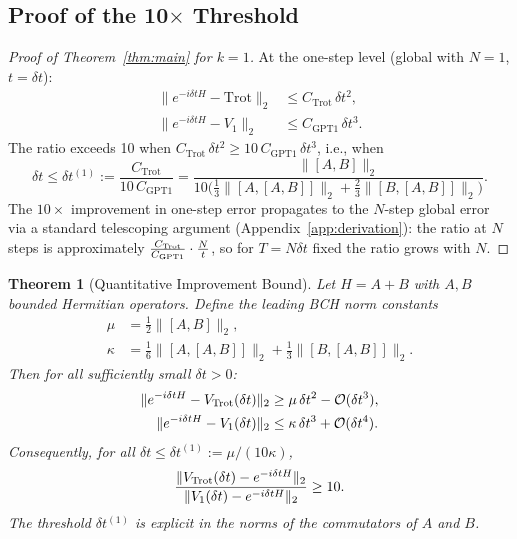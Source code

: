 \documentclass[aps,prxquantum,twocolumn,nofootinbib]{revtex4-2}
\newtheorem{theorem}{Theorem}
\begin{document}
\subsection{Proof of the 10$\times$ Threshold}

\begin{proof}[Proof of Theorem~\ref{thm:main} for $k=1$]
At the one-step level (global with $N=1$, $t=\delta t$):
\begin{align}
  \|e^{-i\delta t H} - \text{Trot}\|_2
  &\leq C_{\mathrm{Trot}}\,\delta t^2, \label{eq:trot-bound}\\
  \|e^{-i\delta t H} - V_1\|_2
  &\leq C_{\mathrm{GPT1}}\,\delta t^3. \label{eq:gpt1-bound}
\end{align}
The ratio exceeds 10 when
$C_{\mathrm{Trot}}\,\delta t^2 \geq 10\,C_{\mathrm{GPT1}}\,\delta t^3$,
i.e., when
\begin{equation}
  \delta t \leq \delta t^{(1)}
  := \frac{C_{\mathrm{Trot}}}{10\,C_{\mathrm{GPT1}}}
  = \frac{\|[A,B]\|_2}{10\bigl(\frac{1}{3}\|[A,[A,B]]\|_2
    + \frac{2}{3}\|[B,[A,B]]\|_2\bigr)}.
  \label{eq:threshold}
\end{equation}
The $10\times$ improvement in one-step error propagates to the
$N$-step global error via a standard telescoping argument
(Appendix~\ref{app:derivation}): the ratio at $N$ steps is
approximately $\frac{C_{\rm Trot}}{C_{\rm GPT1}}\cdot\frac{N}{t}$,
so for $T = N\delta t$ fixed the ratio grows with $N$.
\end{proof}

\begin{theorem}[Quantitative Improvement Bound]
  \label{thm:quantitative}
  Let $H=A+B$ with $A,B$ bounded Hermitian operators.  Define the
  leading BCH norm constants
  \begin{align}
    \mu   &= \tfrac{1}{2}\|[A,B]\|_2, \label{eq:mu-def}\\
    \kappa &= \tfrac{1}{6}\|[A,[A,B]]\|_2
             +\tfrac{1}{3}\|[B,[A,B]]\|_2. \label{eq:kappa-def}
  \end{align}
  Then for all sufficiently small $\delta t>0$:
  \begin{align}
    \|e^{-i\delta t H}-V_{\rm Trot}(\delta t)\|_2
      &\geq \mu\,\delta t^2 - \mathcal{O}(\delta t^3), \label{eq:trot-lower}\\
    \|e^{-i\delta t H}-V_1(\delta t)\|_2
      &\leq \kappa\,\delta t^3 + \mathcal{O}(\delta t^4). \label{eq:gpt1-upper}
  \end{align}
  Consequently, for all
  $\delta t \leq \delta t^{(1)} := \mu/(10\kappa)$,
  \begin{equation}
    \frac{\|V_{\rm Trot}(\delta t)-e^{-i\delta t H}\|_2}
         {\|V_1(\delta t)-e^{-i\delta t H}\|_2}\geq 10. \label{eq:ratio-10}
  \end{equation}
  The threshold $\delta t^{(1)}$ is explicit in the norms of the
  commutators of $A$ and $B$.
\end{theorem}
\end{document}
